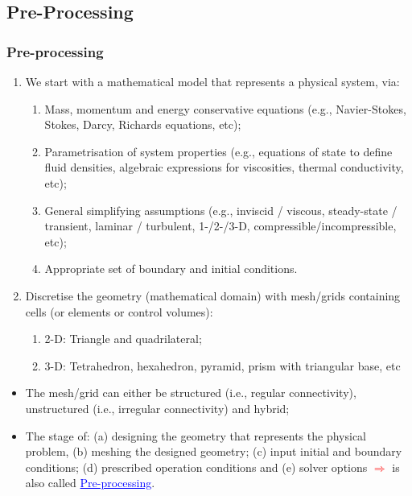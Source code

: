 \documentclass[10pt,compress, unknownkeysallowed]{beamer}
\begin{document}
\subsection{Pre-Processing}

\begin{frame}
 \frametitle{Pre-processing} 
\begin{enumerate}
  \item <1-> We start with a mathematical model that represents a physical system, via:
    \begin{enumerate}
      \item <2-> Mass, momentum and energy conservative equations (e.g., Navier-Stokes, Stokes, Darcy, Richards equations, etc);
      \item <3-> Parametrisation of system properties (e.g., equations of state to define fluid densities, algebraic expressions for viscosities, thermal conductivity, etc);
      \item <4-> General simplifying assumptions (e.g., inviscid / viscous, steady-state / transient, laminar / turbulent, 1-/2-/3-D, compressible/incompressible, etc); 
      \item <5-> Appropriate set of boundary and initial conditions.
    \end{enumerate}
  \item <6-> Discretise the geometry (mathematical domain) with mesh/grids containing cells (or elements or control volumes): 
    \begin{enumerate}
      \item <7-> 2-D: Triangle and quadrilateral;
      \item <8-> 3-D: Tetrahedron, hexahedron, pyramid, prism with triangular base, etc 
    \end{enumerate}
\end{enumerate} 
\begin{itemize}
   \item <9-> The mesh/grid can either be structured (i.e., regular connectivity), unstructured (i.e., irregular connectivity) and hybrid;
   \item <10-> The stage of: (a) designing the geometry that represents the physical problem, (b) meshing the designed geometry; (c) input initial and boundary conditions; (d) prescribed operation conditions and (e) solver options \textcolor{red}{$\Longrightarrow$} is also called \textcolor{blue}{\underline{Pre-processing}}.
\end{itemize}  
\end{frame}
\end{document}

